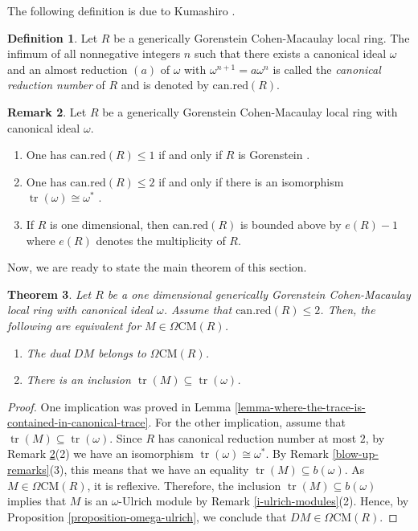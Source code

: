 \documentclass[12pt]{amsart}
\newcommand{\CM}{\mathrm{CM}}
\newtheorem{theorem}{Theorem}[section]
\theoremstyle{definition}
\newtheorem{definition}[theorem]{Definition}
\newtheorem{remark}[theorem]{Remark}
\numberwithin{equation}{theorem}
\DeclareMathOperator{\tr}{\mathrm{tr}}
\begin{document}
The following definition is due to Kumashiro \cite[Definition 2.6]{Kumashiro}.
\begin{definition}
    Let $R$ be a generically Gorenstein Cohen-Macaulay local ring. The infimum of all nonnegative integers $n$ such that there exists a canonical ideal $\omega$ and an almost reduction $(a)$ of $\omega$ with $\omega^{n+1} = a\omega^n$ is called the \textit{canonical reduction number} of $R$ and is denoted by $\mathrm{can.red}(R)$.   
\end{definition}
\begin{remark}\label{canonical-reduction-remarks}
    Let $R$ be a generically Gorenstein Cohen-Macaulay local ring with canonical ideal $\omega$.
    \begin{enumerate}
        \item One has $\mathrm{can.red}(R) \leq 1$ if and only if $R$ is Gorenstein \cite[Proposition 2.9]{Kumashiro}.
        \item One has $\mathrm{can.red}(R) \leq 2$ if and only if there is an isomorphism $\tr(\omega) \cong \omega^*$ \cite[Theorem 2.13]{Kumashiro}. 
        \item If $R$ is one dimensional, then $\mathrm{can.red}(R)$ is bounded above by $e(R) - 1$ where $e(R)$ denotes the multiplicity of $R$.
    \end{enumerate}
\end{remark}
Now, we are ready to state the main theorem of this section.
\begin{theorem}\label{theorem-for-canonical-reduction-2}
    Let $R$ be a one dimensional generically Gorenstein Cohen-Macaulay local ring with canonical ideal $\omega$. Assume that $\mathrm{can.red}(R) \leq 2$. Then, the following are equivalent for $M \in \Omega \CM(R)$.
    \begin{enumerate}
        \item The dual $DM$ belongs to $\Omega \CM(R)$.
        \item There is an inclusion $\tr(M) \subseteq \tr(\omega)$. 
    \end{enumerate}
\end{theorem}
\begin{proof}
    One implication was proved in Lemma \ref{lemma-where-the-trace-is-contained-in-canonical-trace}. For the other implication, assume that $\tr(M) \subseteq \tr(\omega)$. Since $R$ has canonical reduction number at most $2$, by Remark \ref{canonical-reduction-remarks}(2) we have an isomorphism $\tr(\omega) \cong \omega^*$. By Remark \ref{blow-up-remarks}(3), this means that we have an equality $\tr(M) \subseteq b(\omega)$. As $M \in \Omega \CM(R)$, it is reflexive. Therefore, the inclusion $\tr(M) \subseteq b(\omega)$ implies that $M$ is an $\omega$-Ulrich module by Remark \ref{i-ulrich-modules}(2). Hence, by Proposition \ref{proposition-omega-ulrich}, we conclude that $DM \in \Omega \CM(R)$. 
\end{proof}
\end{document}

